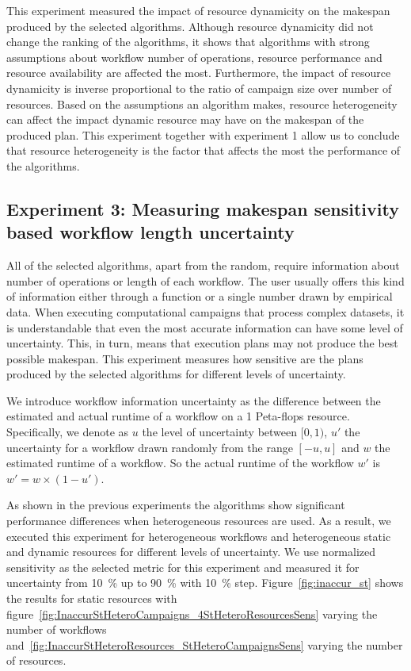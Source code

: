 This experiment measured the impact of resource dynamicity on the makespan produced by the selected algorithms.
Although resource dynamicity did not change the ranking of the algorithms, it shows that algorithms with strong assumptions about workflow number of operations, resource performance and resource availability are affected the most.
Furthermore, the impact of resource dynamicity is inverse proportional to the ratio of campaign size over number of resources.
Based on the assumptions an algorithm makes, resource heterogeneity can affect the impact dynamic resource may have on the makespan of the produced plan.
This experiment together with experiment 1 allow us to conclude that resource heterogeneity is the factor that affects the most the performance of the algorithms.


\subsection{Experiment 3: Measuring makespan sensitivity based workflow length uncertainty}

All of the selected algorithms, apart from the random, require information about number of operations or length of each workflow.
The user usually offers this kind of information either through a function or a single number drawn by empirical data.
When executing computational campaigns that process complex datasets, it is understandable that even the most accurate information can have some level of uncertainty.
This, in turn, means that execution plans may not produce the best possible makespan.
This experiment measures how sensitive are the plans produced by the selected algorithms for different levels of uncertainty.

We introduce workflow information uncertainty as the difference between the estimated and actual runtime of a workflow on a 1 Peta-flops resource.
Specifically, we denote as $u$ the level of uncertainty between $[0,1)$, $u'$ the uncertainty for a workflow drawn randomly from the range $[-u,u]$ and $w$ the estimated runtime of a workflow.
So the actual runtime of the workflow $w'$ is $ w' = w \times (1-u')$.

As shown in the previous experiments the algorithms show significant performance differences when heterogeneous resources are used.
As a result, we executed this experiment for heterogeneous workflows and heterogeneous static and dynamic resources for different levels of uncertainty.
We use normalized sensitivity as the selected metric for this experiment and measured it for uncertainty from 10~\% up to 90~\% with 10~\% step.
Figure~\ref{fig:inaccur_st} shows the results for static resources with figure~\ref{fig:InaccurStHeteroCampaigns_4StHeteroResourcesSens} varying the number of workflows and~\ref{fig:InaccurStHeteroResources_StHeteroCampaignsSens} varying the number of resources.

